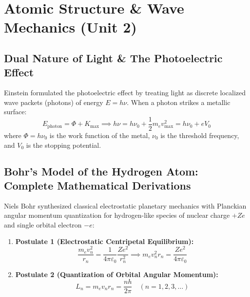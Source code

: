 \documentclass[10pt,twoside,openright]{book}
\begin{document}
\section{Atomic Structure \& Wave Mechanics (Unit 2)}

\subsection{Dual Nature of Light \& The Photoelectric Effect}
Einstein formulated the photoelectric effect by treating light as discrete localized wave packets (photons) of energy $E = h\nu$. When a photon strikes a metallic surface:
\begin{equation}
  E_{\text{photon}} = \Phi + K_{\max} \implies h\nu = h\nu_0 + \frac{1}{2}m_e v_{\max}^2 = h\nu_0 + e V_0
\end{equation}
where $\Phi = h\nu_0$ is the work function of the metal, $\nu_0$ is the threshold frequency, and $V_0$ is the stopping potential.

\subsection{Bohr's Model of the Hydrogen Atom: Complete Mathematical Derivations}
Niels Bohr synthesized classical electrostatic planetary mechanics with Planckian angular momentum quantization for hydrogen-like species of nuclear charge $+Ze$ and single orbital electron $-e$:
\begin{enumerate}
  \item \textbf{Postulate 1 (Electrostatic Centripetal Equilibrium):}
  \begin{equation}
    \frac{m_e v_n^2}{r_n} = \frac{1}{4\pi\varepsilon_0}\frac{Z e^2}{r_n^2} \implies m_e v_n^2 r_n = \frac{Z e^2}{4\pi\varepsilon_0}
    \label{eq:bohr_force}
  \end{equation}
  \item \textbf{Postulate 2 (Quantization of Orbital Angular Momentum):}
  \begin{equation}
    L_n = m_e v_n r_n = \frac{n h}{2\pi} \quad (n = 1, 2, 3, \dots)
    \label{eq:bohr_quant}
  \end{equation}
\end{enumerate}
\end{document}
